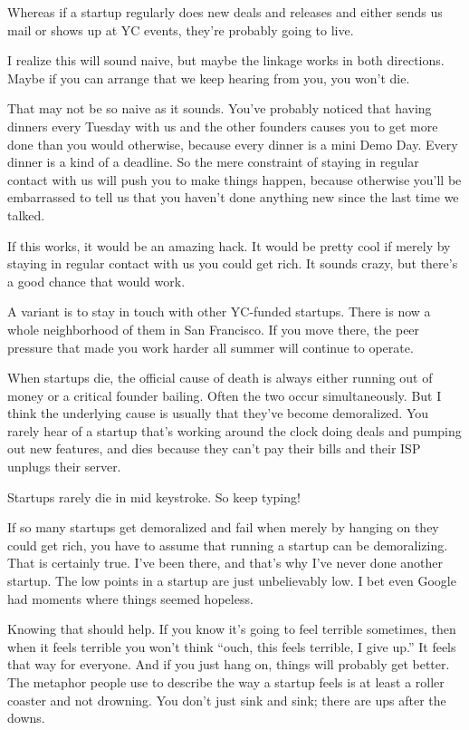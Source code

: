 Whereas if a startup regularly does new deals and releases and either
sends us mail or shows up at YC events, they're probably going to live.

I realize this will sound naive, but maybe the linkage works in both
directions. Maybe if you can arrange that we keep hearing from you, you
won't die.

That may not be so naive as it sounds. You've probably noticed that
having dinners every Tuesday with us and the other founders causes you
to get more done than you would otherwise, because every dinner is a
mini Demo Day. Every dinner is a kind of a deadline. So the mere
constraint of staying in regular contact with us will push you to make
things happen, because otherwise you'll be embarrassed to tell us that
you haven't done anything new since the last time we talked.

If this works, it would be an amazing hack. It would be pretty cool if
merely by staying in regular contact with us you could get rich. It
sounds crazy, but there's a good chance that would work.

A variant is to stay in touch with other YC-funded startups. There is
now a whole neighborhood of them in San Francisco. If you move there,
the peer pressure that made you work harder all summer will continue to
operate.

When startups die, the official cause of death is always either running
out of money or a critical founder bailing. Often the two occur
simultaneously. But I think the underlying cause is usually that they've
become demoralized. You rarely hear of a startup that's working around
the clock doing deals and pumping out new features, and dies because
they can't pay their bills and their ISP unplugs their server.

Startups rarely die in mid keystroke. So keep typing!

If so many startups get demoralized and fail when merely by hanging on
they could get rich, you have to assume that running a startup can be
demoralizing. That is certainly true. I've been there, and that's why
I've never done another startup. The low points in a startup are just
unbelievably low. I bet even Google had moments where things seemed
hopeless.

Knowing that should help. If you know it's going to feel terrible
sometimes, then when it feels terrible you won't think ``ouch, this
feels terrible, I give up.'' It feels that way for everyone. And if you
just hang on, things will probably get better. The metaphor people use
to describe the way a startup feels is at least a roller coaster and not
drowning. You don't just sink and sink; there are ups after the downs.

